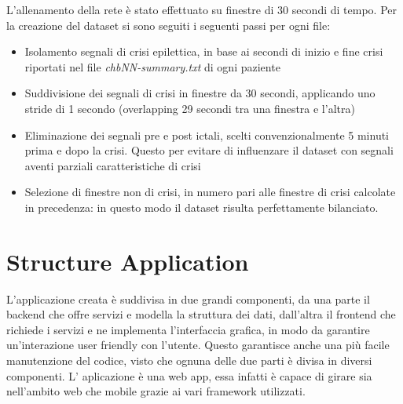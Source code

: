 \documentclass{article}
\begin{document}
L'allenamento della rete è stato effettuato su finestre di 30 secondi di tempo. Per la creazione del dataset si sono seguiti i seguenti passi per ogni file:
\begin{itemize}
\item Isolamento segnali di crisi epilettica, in base ai secondi di inizio e fine crisi riportati nel file \textit{chbNN-summary.txt} di ogni paziente
\item Suddivisione dei segnali di crisi in finestre da 30 secondi, applicando uno stride di 1 secondo (overlapping 29 secondi tra una finestra e l'altra)
\item Eliminazione dei segnali pre e post ictali, scelti convenzionalmente 5 minuti prima e dopo la crisi. Questo per evitare di influenzare il dataset con segnali aventi parziali caratteristiche di crisi
\item Selezione di finestre non di crisi, in numero pari alle finestre di crisi calcolate in precedenza: in questo modo il dataset risulta perfettamente bilanciato.
\end{itemize}

\section{Structure Application}
L'applicazione creata è suddivisa in due grandi componenti, da una parte il backend che offre servizi e modella la struttura dei dati, dall'altra il frontend che richiede i servizi e ne implementa l'interfaccia grafica, in modo da garantire un'interazione user friendly con l'utente.
Questo garantisce anche una più facile manutenzione del codice, visto che ognuna delle due parti è divisa in diversi componenti.
L' aplicazione è una web app, essa infatti è capace di girare sia nell'ambito web che mobile grazie ai vari framework utilizzati.
\end{document}
